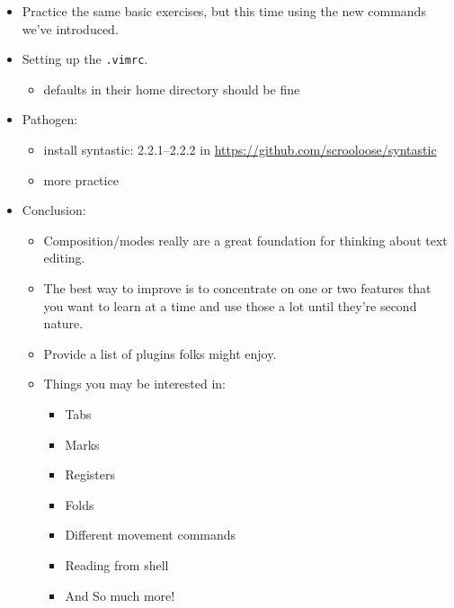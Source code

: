 \documentclass{article}
\begin{document}
\begin{itemize}
\begin{itemize}
\end{itemize}
\item Practice the same basic exercises, but this time using the new commands we've
	introduced.
\item Setting up the \verb|.vimrc|.
\begin{itemize}
\item defaults in their home directory should be fine
\end{itemize}
\item Pathogen:
\begin{itemize}
\item install syntastic: 2.2.1--2.2.2 in \url{https://github.com/scrooloose/syntastic}
\item more practice
\end{itemize}
\item Conclusion:
\begin{itemize}
\item Composition/modes really are a great foundation for thinking about text
		editing.
\item The best way to improve is to concentrate on one or two features that you
		want to learn at a time and use those a lot until they're second nature.
\item Provide a list of plugins folks might enjoy.
\item Things you may be interested in:
\begin{itemize}
\item Tabs
\item Marks
\item Registers
\item Folds
\item Different movement commands
\item Reading from shell
\item And So much more!\end{itemize}
\end{itemize}
\end{itemize}
\end{document}

